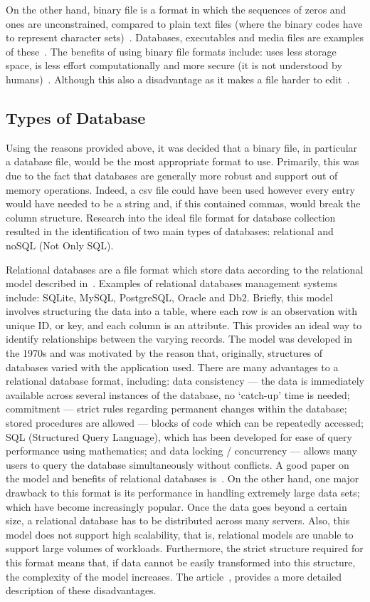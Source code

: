 On the other hand, binary file is a format in which the sequences of zeros and ones are
unconstrained, compared to plain text files (where the binary codes have to
represent character sets)~\cite{Spacey2017}. Databases, executables and media
files are examples of these~\cite{Spacey2017}. The benefits of using binary file formats
include: uses less storage space, is less effort computationally and more
secure (it is not understood by humans)~\cite{Azad}. Although this also a
disadvantage as it makes a file harder to edit~\cite{Azad}.

\subsection{Types of Database}\label{subsec:Types_of_DB}
Using the reasons provided above, it was decided that a binary file, in
particular a database file, would be
the most appropriate format to use. Primarily, this was due to the fact that
databases are generally more robust and support out of memory operations.
Indeed, a csv file could have been used however every entry would have needed to be
a string and, if this contained commas, would break the column structure. Research into the ideal
file format for database collection resulted in the identification of two main
types of databases: relational and noSQL (Not Only SQL).

Relational databases are a file format which store data according to the
relational model described in~\cite{Codd2002}. Examples of relational
databases management systems include: SQLite, MySQL, PostgreSQL, Oracle and Db2.
Briefly, this model involves structuring the data into a table, where each
row is an observation with unique ID, or key, and each column is an
attribute. This provides an ideal way to identify relationships
between the varying records. The model was developed in the 1970s and was
motivated by the reason that, originally, structures of databases varied with the
application used. There are many advantages to a relational
database format, including: data consistency --- the data is immediately available
across several instances of the database, no `catch-up' time is needed; commitment
--- strict rules regarding permanent changes within the database;
stored procedures are allowed --- blocks of code which can be repeatedly accessed; SQL
(Structured Query Language), which has been developed for ease of query performance
using mathematics; and data
locking / concurrency --- allows many users to query the database
simultaneously without conflicts. A good paper on the model and benefits of
relational databases is~\cite{Oracle2020}. On the other hand, one major
drawback to this format is its performance in handling extremely large data
sets; which have become increasingly popular. Once the data goes beyond a
certain size, a relational database has to be distributed across many servers.
Also, this model does not support high scalability, that is, relational models
are unable to support large volumes of workloads. Furthermore, the strict structure
required for this format means that, if data cannot be easily transformed
into this structure, the complexity of the model increases. The
article~\cite{Jatana2012}, provides a more detailed description of these disadvantages. 

